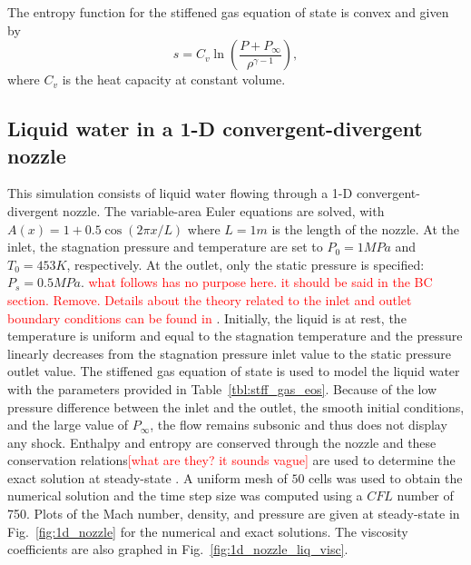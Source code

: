 \documentclass[preprint,10pt]{elsarticle}
\newcommand{\fig}[1]{Fig.~\ref{#1}}                      %
\newcommand{\tbl}[1]{Table~\ref{#1}}                     %
\newcommand{\tcr}[1]{\textcolor{red}{#1}}
\begin{document}
The entropy function for the stiffened gas equation of state is convex and given by
%
\begin{equation*}
s = C_v \ln \left( \frac{P+P_\infty}{\rho^{\gamma-1}} \right) ,
\end{equation*}
where $C_v$ is the heat capacity at constant volume.

\subsection{Liquid water in a 1-D convergent-divergent nozzle} \label{sec:liquid_nozzle}

This simulation consists of liquid water flowing through a 1-D convergent-divergent nozzle. The variable-area Euler equations are solved, with $A(x) = 1 + 0.5 \cos(2 \pi x / L)$ where $L=1m$ is the length of the nozzle. At the inlet, the stagnation pressure and temperature are set to $P_0 = 1 MPa$ and $T_0 = 453 K$, respectively. At the outlet, only the static pressure is specified: $P_s = 0.5MPa$. 
\tcr{what follows has no purpose here. it should be said in the BC section. Remove. Details about the theory related to the inlet and outlet boundary conditions can be found in \cite{SEM}}. 
Initially, the liquid is at rest, the temperature is uniform and equal to the stagnation temperature and the pressure linearly decreases from the stagnation pressure inlet value to the static pressure outlet value. 
The stiffened gas equation of state is used to model the liquid water with the parameters provided in \tbl{tbl:stff_gas_eos}.
Because of the low pressure difference between the inlet and the outlet, the smooth initial conditions, and the large value of $P_\infty$, the flow remains subsonic and thus does not display any shock. Enthalpy and entropy are conserved through the nozzle and these conservation relations\tcr{[what are they? it sounds vague]} are used to determine the exact solution at steady-state \cite{nozzle_exact}. A uniform mesh of $50$ cells was used to obtain the numerical solution and the time step size was computed using a $CFL$ number of 750.
Plots of the Mach number, density, and pressure are given at steady-state in \fig{fig:1d_nozzle} for the numerical and exact solutions. The viscosity coefficients are also graphed in \fig{fig:1d_nozzle_liq_visc}. 
\end{document}
